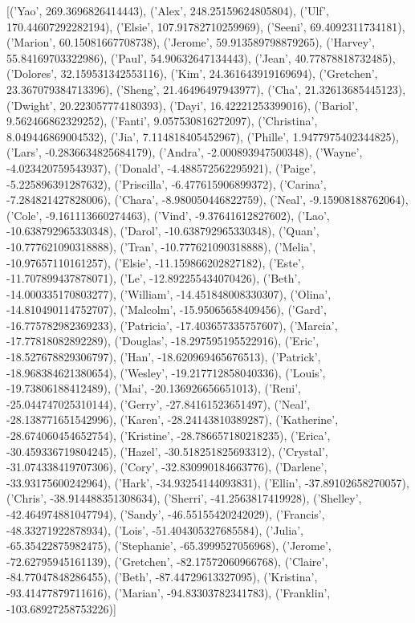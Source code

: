 \documentclass{icmmcm}
\begin{document}
[('Yao', 269.3696826414443), ('Alex', 248.25159624805804), ('Ulf', 170.44607292282194), ('Elsie', 107.91782710259969), ('Seeni', 69.4092311734181), ('Marion', 60.15081667708738), ('Jerome', 59.913589798879265), ('Harvey', 55.84169703322986), ('Paul', 54.90632647134443), ('Jean', 40.77878818732485), ('Dolores', 32.159531342553116), ('Kim', 24.361643919169694), ('Gretchen', 23.367079384713396), ('Sheng', 21.46496497943977), ('Cha', 21.32613685445123), ('Dwight', 20.223057774180393), ('Dayi', 16.42221253399016), ('Bariol', 9.562466862329252), ('Fanti', 9.057530816272097), ('Christina', 8.049446869004532), ('Jia', 7.114818405452967), ('Phille', 1.9477975402344825), ('Lars', -0.2836634825684179), ('Andra', -2.000893947500348), ('Wayne', -4.023420759543937), ('Donald', -4.488572562295921), ('Paige', -5.225896391287632), ('Priscilla', -6.477615906899372), ('Carina', -7.284821427828006), ('Chara', -8.980050446822759), ('Neal', -9.15908188762064), ('Cole', -9.161113660274463), ('Vind', -9.37641612827602), ('Lao', -10.638792965330348), ('Darol', -10.638792965330348), ('Quan', -10.777621090318888), ('Tran', -10.777621090318888), ('Melia', -10.97657110161257), ('Elsie', -11.159866202827182), ('Este', -11.707899437878071), ('Le', -12.892255434070426), ('Beth', -14.000335170803277), ('William', -14.451848008330307), ('Olina', -14.810490114752707), ('Malcolm', -15.95065658409456), ('Gard', -16.775782982369233), ('Patricia', -17.403657335757607), ('Marcia', -17.77818082892289), ('Douglas', -18.297595195522916), ('Eric', -18.527678829306797), ('Han', -18.620969465676513), ('Patrick', -18.968384621380654), ('Wesley', -19.217712858040336), ('Louis', -19.73806188412489), ('Mai', -20.136926656651013), ('Reni', -25.044747025310144), ('Gerry', -27.84161523651497), ('Neal', -28.138771651542996), ('Karen', -28.24143810389287), ('Katherine', -28.674060454652754), ('Kristine', -28.786657180218235), ('Erica', -30.459336719804245), ('Hazel', -30.518251825693312), ('Crystal', -31.074338419707306), ('Cory', -32.830990184663776), ('Darlene', -33.93175600242964), ('Hark', -34.93254144093831), ('Ellin', -37.89102658270057), ('Chris', -38.914488351308634), ('Sherri', -41.2563817419928), ('Shelley', -42.464974881047794), ('Sandy', -46.55155420242029), ('Francis', -48.33271922878934), ('Lois', -51.404305327685584), ('Julia', -65.35422875982475), ('Stephanie', -65.3999527056968), ('Jerome', -72.62795945161139), ('Gretchen', -82.17572060966768), ('Claire', -84.77047848286455), ('Beth', -87.44729613327095), ('Kristina', -93.41477879711616), ('Marian', -94.83303782341783), ('Franklin', -103.68927258753226)]
\end{document}
